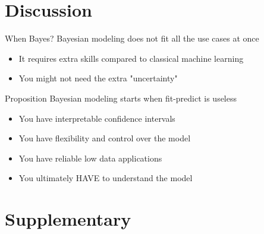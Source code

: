 \documentclass{beamer}
\begin{document}
\section{Discussion}
\begin{frame}{When Bayes?}
Bayesian modeling does not fit all the use cases at once
\begin{itemize}
    \item It requires extra skills compared to classical machine learning
    \item You might not need the extra "uncertainty"
\end{itemize}
\pause
\begin{block}{Proposition}
    Bayesian modeling starts when fit-predict is useless
\end{block}
\pause
\begin{itemize}
    \item You have interpretable confidence intervals
    \item You have flexibility and control over the model
    \item You have reliable low data applications
    \item<alert@+> You ultimately HAVE to understand the model
\end{itemize}
\end{frame}
\section{Supplementary}
\end{document}
